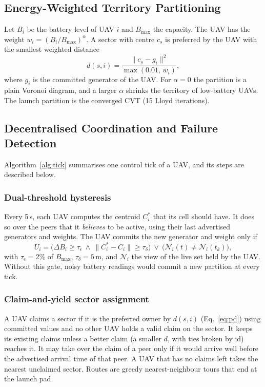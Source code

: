 \documentclass[10pt,a4paper,twocolumn]{article}
\begin{document}
\subsection{Energy-Weighted Territory Partitioning}
Let $B_i$ be the battery level of UAV $i$ and $B_{\max}$ the capacity. The UAV has the weight $w_i=(B_i/B_{\max})^{\alpha}$. A sector with centre $c_s$ is preferred by the UAV with the smallest weighted distance
\begin{equation}
d(s,i)=\frac{\lVert c_s-g_i\rVert^2}{\max(0.01,\,w_i)},
\label{eq:pd}
\end{equation}
where $g_i$ is the committed generator of the UAV. For $\alpha=0$ the partition is a plain Voronoi diagram, and a larger $\alpha$ shrinks the territory of low-battery UAVs. The launch partition is the converged CVT (15 Lloyd iterations).

\subsection{Decentralised Coordination and Failure Detection}
Algorithm~\ref{alg:tick} summarises one control tick of a UAV, and its steps are described below.
\subsubsection{Dual-threshold hysteresis}Every 5\,s, each UAV computes the centroid $C_i^*$ that its cell should have. It does so over the peers that it \emph{believes} to be active, using their last advertised generators and weights. The UAV commits the new generator and weight only if
\begin{equation}
U_i=\big(\Delta B_i\ge\tau_\epsilon\ \wedge\ \lVert C_i^*-C_i\rVert\ge\tau_\delta\big)\ \vee\ \big(\mathcal N_i(t)\ne\mathcal N_i(t_k)\big),
\label{eq:commit}
\end{equation}
with $\tau_\epsilon=2\%$ of $B_{\max}$, $\tau_\delta=5$\,m, and $\mathcal N_i$ the view of the live set held by the UAV. Without this gate, noisy battery readings would commit a new partition at every tick.

\subsubsection{Claim-and-yield sector assignment}A UAV claims a sector if it is the preferred owner by $d(s,i)$ (Eq.~\ref{eq:pd}) using committed values and no other UAV holds a valid claim on the sector. It keeps its existing claims unless a better claim (a smaller $d$, with ties broken by id) reaches it. It may take over the claim of a peer only if it would arrive well before the advertised arrival time of that peer. A UAV that has no claims left takes the nearest unclaimed sector. Routes are greedy nearest-neighbour tours that end at the launch pad.
\end{document}

